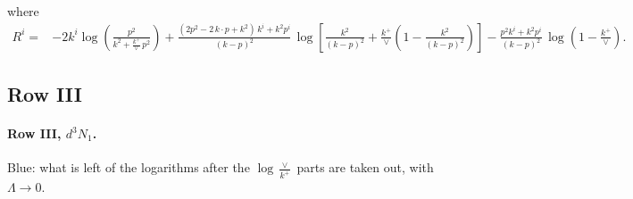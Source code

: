 \documentclass[10pt]{article}
\numberwithin{equation}{section}
\newcommand{\new}[1]{{\color{blue}#1}}
\begin{document}
where
\begin{align}
R^{i} =& -2k^{i}\log\left(\frac{p^{2}}{k^{2}+\frac{k^{+}}{\vee}\,p^{2}}\right)
+\frac{(2p^{2}-2\,k\cdot p+k^{2})\,k^{i}+k^{2}p^{i}}{(k-p)^{2}}\,
\log\left[\frac{k^{2}}{(k-p)^{2}}+\frac{k^{+}}{\vee}\left(1-\frac{k^{2}}{(k-p)^{2}}\right)\right]
-\frac{p^{2}k^{i}+k^{2}p^{i}}{(k-p)^{2}}\,\log\left(1-\frac{k^{+}}{\vee}\right).
\end{align}
\subsection{Row III}
\paragraph{Row III, $d^3N_1$.}
\new{Blue}: what is left of the logarithms after the $\log\frac{\vee}{k^+}$ parts are taken out, with $\Lambda\to0$.
\end{document}
